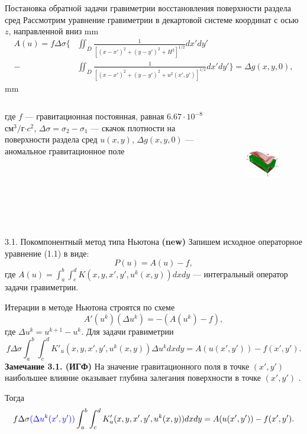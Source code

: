 \documentclass[10pt,pdf, mathserif, hyperref={unicode}]{beamer}
\begin{document}
\begin{frame}{Постановка обратной задачи гравиметрии восстановления поверхности раздела сред}
	Рассмотрим уравнение гравиметрии в декартовой системе координат с осью $z$, направленной вниз 
 mm
	\begin{equation*}
	\begin{aligned}
	A(u)=f\Delta\sigma \bigg\{ &\iint_{D} \frac{1}{[(x-x')^2+(y-y')^2+H^2]^{1/2}}dx'dy' \\
	- &\iint_{D} \frac{1}{[(x-x')^2+(y-y')^2+u^2(x',y')]^{1/2}}dx'dy'\bigg\}=\Delta g(x,y,0),
	\end{aligned} 
	\end{equation*}
 mm
	\begin{columns}
		где $f$ --- гравитационная постоянная, равная $6.67\cdot10^{-8}$ см$^3/$г$\cdot c^2$, $\Delta\sigma=\sigma_2-\sigma_1$ --- скачок плотности на поверхности раздела сред $u(x,y)$, $\Delta g(x,y,0)$ --- аномальное гравитационное поле%
		\begin{figure}[h]
			\centering
			\includegraphics[height=4cm]{grav_illust.png}
			\label{fig:twolayer}
		\end{figure}
	\end{columns}
\end{frame}

\begin{frame}{3.1. Покомпонентный метод типа Ньютона \textbf{(new)}}
	Запишем исходное операторное уравнение (1.1) в виде:
	$$P(u)=A(u)-f,$$
	где $A(u)=\int_{a}^{b}\int_{c}^{d}K(x,y, x',y',u^k(x,y))dxdy$ --- интегральный оператор задачи гравиметрии.
	
	Итерации в методе Ньютона строятся по схеме
	$$A'(u^k)(\Delta u^k)=-(A(u^k)-f),$$ где $\Delta u^k=u^{k+1}-u^k$.
	Для задачи гравиметрии
	$$f\Delta\sigma\int_{a}^{b}\int_{c}^{d}K'_u(x,y, x',y',u^k(x,y))\Delta u^k dxdy=A(u(x',y'))-f(x',y').$$
 \textbf{Замечание 3.1. (ИГФ)} {\color{blue}  На значение гравитационного поля в точке $(x',y')$ наибольшее влияние оказывает глубина залегания поверхности в точке $(x',y')$ .} 

Тогда
	$$f\Delta\sigma{\color{blue}(\Delta u^k(x',y'))}\int_{a}^{b}\int_{c}^{d}K'_u(x,y, x',y',u^k(x,y)) dxdy=A(u(x',y'))-f(x',y').$$
\end{frame}
\end{document}
